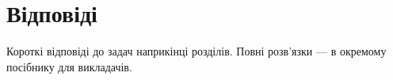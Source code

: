 \chapter{Відповіді}
\label{sec:answers}

Короткі відповіді до задач наприкінці розділів. Повні розв'язки --- в окремому посібнику для викладачів.























